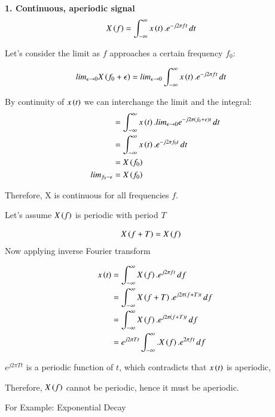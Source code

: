 \documentclass[journal,12pt,onecolumn]{IEEEtran}
\theoremstyle{remark}
\begin{document}
\textbf{1. Continuous, aperiodic signal}\\

\begin{align}
X\left(f\right)&=\int_{-\infty}^{\infty} x\left(t\right).e^{-j2\pi ft}\,dt
\end{align}

Let's consider the limit as $f$ approaches a certain frequency $f_0$:

\begin{align}
lim_{\epsilon \rightarrow 0}X\left(f_0+\epsilon\right)&= lim_{\epsilon \rightarrow 0}\int_{-\infty}^{\infty} x\left(t\right).e^{-j2\pi ft}\,dt
\end{align}

By continuity of $x\left(t\right)$ we can interchange the limit and the integral:
\begin{align}
&=\int_{-\infty}^{\infty} x\left(t\right).lim_{\epsilon\rightarrow0}e^{-j2\pi\left(f_0+\epsilon\right)t}\,dt\\
&=\int_{-\infty}^{\infty} x\left(t\right).e^{-j2\pi f_0 t}\,dt\\
&=X\left(f_0\right)\\
 lim_{f_0-\epsilon}&=X\left(f_0\right)
\end{align}

Therefore, X is continuous for all frequencies $f$.

Let's assume $X\left(f\right)$ is periodic with period $T$ 

\begin{align}
X\left(f+T\right)&=X\left(f\right)
\end{align}
Now applying inverse Fourier transform

\begin{align}
x\left(t\right)&=\int_{-\infty}^{\infty} X\left(f\right).e^{j2\pi ft}\,df\\
&=\int_{-\infty}^{\infty} X\left(f+T\right).e^{j2\pi \left(f+T\right)t}\,df\\
&=\int_{-\infty}^{\infty} X\left(f\right).e^{j2\pi \left(f+T\right)t}\,df\\
&=e^{j2\pi Tt}\int_{-\infty}^{\infty}.X\left(f\right).e^{2\pi ft}\, df
\end{align}

$e^{j2\pi Tt}$ is a periodic function of $t$, which contradicts that $x\left(t\right)$ is aperiodic,

Therefore, $X\left(f\right)$ cannot be periodic, hence it must be aperiodic.\\
\vspace{2mm}

For Example: Exponential Decay
\end{document}
